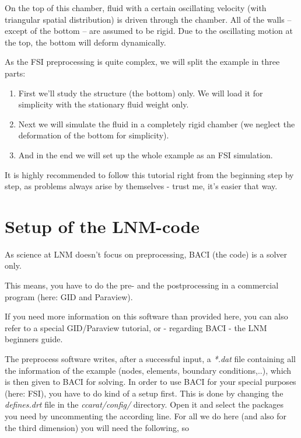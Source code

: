 On the top of this chamber, fluid with a certain oscillating velocity
(with triangular spatial distribution) is driven through the chamber. All
of the walls -- except of the bottom -- are assumed to be rigid. Due
to the oscillating motion at the top, the bottom will deform dynamically.

As the FSI preprocessing is quite complex, we will split the example
in three parts:

\begin{enumerate}
\item First we'll study the structure (the bottom) only. We will load it
for simplicity with the stationary fluid weight only.
\item Next we will simulate the fluid in a completely rigid chamber (we
neglect the deformation of the bottom for simplicity).
\item And in the end we will set up the whole example as an FSI simulation.
\end{enumerate}
It is highly recommended to follow this tutorial right from the beginning
step by step, as problems always arise by themselves - trust me, it's
easier that way.


\section{Setup of the LNM-code}

As science at LNM doesn't focus on preprocessing, BACI (the code)
is a solver only.

This means, you have to do the pre- and the postprocessing in a commercial
program (here: GID and Paraview). 

If you need more information on this software than provided here,
you can also refer to a special GID/Paraview tutorial, or - regarding
BACI - the LNM beginners guide.

The preprocess software writes, after a successful input, a \emph{{*}.dat}
file containing all the information of the example (nodes, elements,
boundary conditions,..), which is then given to BACI for solving.
In order to use BACI for your special purposes (here: FSI), you have
to do kind of a setup first. This is done by changing the \emph{defines.drt}
file in the \emph{ccarat/config/} directory. Open it and select the
packages you need by uncommenting the according line. For all we do
here (and also for the third dimension) you will need the following,
so

